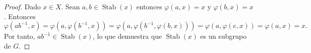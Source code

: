 \begin{proof}
	Dado $x\in X$. Sean $a,b\in \operatorname{Stab}(x)$ entonces $\varphi(a,x)=x$ y $\varphi(b,x)=x$. Entonces $$\varphi(ab^{-1},x)=\varphi\left(a,\varphi(b^{-1},x)\right)=\varphi\left(a,\varphi(b^{-1},\varphi(b,x))\right)=\varphi\left(a,\varphi(e,x)\right)=\varphi(a,x)=x.$$Por tanto, \( ab^{-1} \in \operatorname{Stab}(x) \), lo que demuestra que \( \operatorname{Stab}(x) \) es un subgrupo de \( G \).
\end{proof}



